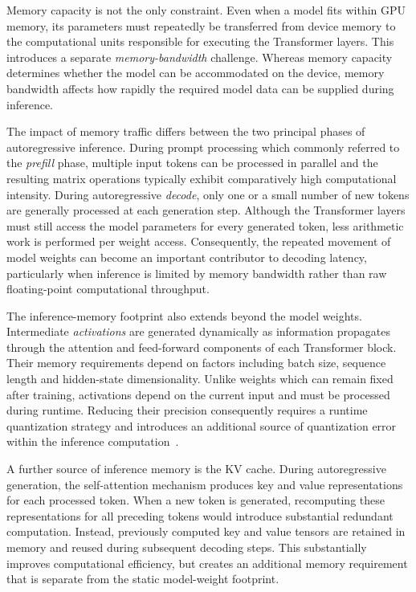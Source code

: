 Memory capacity is not the only constraint. Even when a model fits within GPU memory, its parameters must repeatedly be transferred from device memory to the computational units responsible for executing the Transformer layers. This introduces a separate \emph{memory-bandwidth} challenge. Whereas memory capacity determines whether the model can be accommodated on the device, memory bandwidth affects how rapidly the required model data can be supplied during inference.

The impact of memory traffic differs between the two principal phases of autoregressive inference. During prompt processing which commonly referred to the \emph{prefill} phase, multiple input tokens can be processed in parallel and the resulting matrix operations typically exhibit comparatively high computational intensity. During autoregressive \emph{decode}, only one or a small number of new tokens are generally processed at each generation step. Although the Transformer layers must still access the model parameters for every generated token, less arithmetic work is performed per weight access. Consequently, the repeated movement of model weights can become an important contributor to decoding latency, particularly when inference is limited by memory bandwidth rather than raw floating-point computational throughput\cite{kim2024squeezellmdenseandsparsequantization}.

The inference-memory footprint also extends beyond the model weights. Intermediate \emph{activations} are generated dynamically as information propagates through the attention and feed-forward components of each Transformer block. Their memory requirements depend on factors including batch size, sequence length and hidden-state dimensionality\cite{dao2022flashattentionfastmemoryefficientexact}. Unlike weights which can remain fixed after training, activations depend on the current input and must be processed during runtime. Reducing their precision consequently requires a runtime quantization strategy and introduces an additional source of quantization error within the inference computation~\cite{xiao2023icml-smoothquant}.

A further source of inference memory is the {KV} cache. During autoregressive generation, the self-attention mechanism produces key and value representations for each processed token. When a new token is generated, recomputing these representations for all preceding tokens would introduce substantial redundant computation. Instead, previously computed key and value tensors are retained in memory and reused during subsequent decoding steps. This substantially improves computational efficiency, but creates an additional memory requirement that is separate from the static model-weight footprint.

